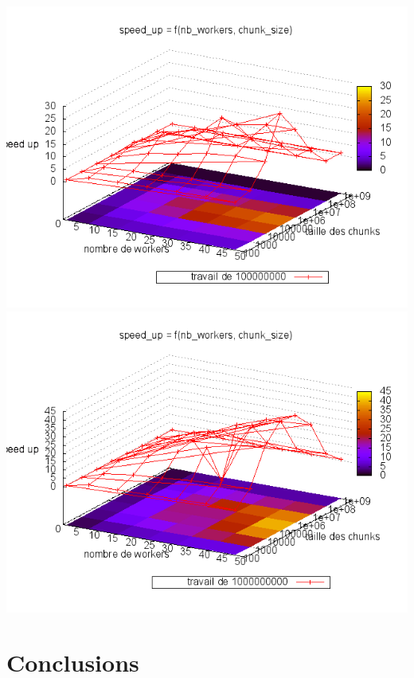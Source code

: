 \documentclass[oneside,10pt]{article}
\begin{document}
\includegraphics[scale=0.5]{travail_100000000.png}
\includegraphics[scale=0.5]{travail_1000000000.png}
\section{Conclusions}
\end{document}
